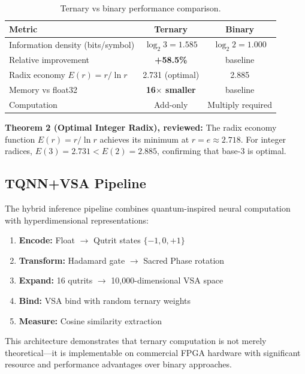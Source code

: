 \documentclass[aps,prd,preprint,superscriptaddress,showpacs,nofootinbib,longbibliography]{revtex4-2}
\begin{document}
\begin{table}[ht]
\centering
\begin{tabular}{lcc}
\toprule
\textbf{Metric} & \textbf{Ternary} & \textbf{Binary} \\
\midrule
Information density (bits/symbol) & $\log_2 3 = 1.585$ & $\log_2 2 = 1.000$ \\
Relative improvement & \textbf{+58.5\%} & baseline \\
Radix economy $E(r) = r/\ln r$ & 2.731 (optimal) & 2.885 \\
Memory vs float32 & \textbf{16$\times$ smaller} & baseline \\
Computation & Add-only & Multiply required \\
\bottomrule
\end{tabular}
\caption{Ternary vs binary performance comparison.}
\label{tab:ternary_bench}
\end{table}

\textbf{Theorem 2 (Optimal Integer Radix), reviewed:} The radix economy function $E(r) = r / \ln r$ achieves its minimum at $r = e \approx 2.718$. For integer radices, $E(3) = 2.731 < E(2) = 2.885$, confirming that base-3 is optimal.

\subsection{TQNN+VSA Pipeline}

The hybrid inference pipeline combines quantum-inspired neural computation with hyperdimensional representations:

\begin{enumerate}[itemsep=2pt]
    \item \textbf{Encode:} Float $\rightarrow$ Qutrit states $\{-1, 0, +1\}$
    \item \textbf{Transform:} Hadamard gate $\rightarrow$ Sacred Phase rotation
    \item \textbf{Expand:} 16 qutrits $\rightarrow$ 10,000-dimensional VSA space
    \item \textbf{Bind:} VSA bind with random ternary weights
    \item \textbf{Measure:} Cosine similarity extraction
\end{enumerate}

This architecture demonstrates that ternary computation is not merely theoretical---it is implementable on commercial FPGA hardware with significant resource and performance advantages over binary approaches.
\end{document}
